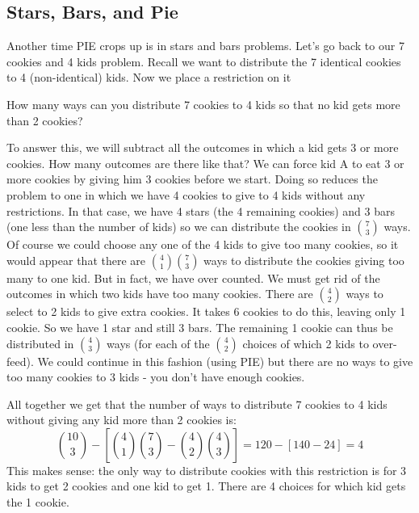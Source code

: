 \documentclass[12pt]{article}
\begin{document}
\subsection{Stars, Bars, and Pie}

Another time PIE crops up is in stars and bars problems.  Let's go back to our 7 cookies and 4 kids problem.  Recall we want to distribute the 7 identical cookies to 4 (non-identical) kids.  Now we place a restriction on it

\begin{example}
How many ways can you distribute 7 cookies to 4 kids so that no kid gets more than 2 cookies?  

\begin{solution}
To answer this, we will subtract all the outcomes in which a kid gets 3 or more cookies.  How many outcomes are there like that?  We can force kid A to eat 3 or more cookies by giving him 3 cookies before we start.  Doing so reduces the problem to one in which we have 4 cookies to give to 4 kids without any restrictions.  In that case, we have 4 stars (the 4 remaining cookies) and 3 bars (one less than the number of kids) so we can distribute the cookies in ${7 \choose 3}$ ways.  Of course we could choose any one of the 4 kids to give too many cookies, so it would appear that there are ${4 \choose 1}{7 \choose 3}$ ways to distribute the cookies giving too many to one kid.  But in fact, we have over counted.  We must get rid of the outcomes in which two kids have too many cookies.  There are ${4 \choose 2}$ ways to select to 2 kids to give extra cookies.  It takes 6 cookies to do this, leaving only 1 cookie.  So we have 1 star and still 3 bars.  The remaining 1 cookie can thus be distributed in ${4 \choose 3}$ ways (for each of the ${4 \choose 2}$ choices of which 2 kids to over-feed).  We could continue in this fashion (using PIE) but there are no ways to give too many cookies to 3 kids - you don't have enough cookies.

All together we get that the number of ways to distribute 7 cookies to 4 kids without giving any kid more than 2 cookies is:
\[{10 \choose 3} - \left[{4 \choose 1}{7 \choose 3} - {4 \choose 2}{4 \choose 3}\right] = 120 - [ 140 - 24] = 4\]
This makes sense: the only way to distribute cookies with this restriction is for 3 kids to get 2 cookies and one kid to get 1.  There are 4 choices for which kid gets the 1 cookie.
\end{solution}
\end{example}
\end{document}
